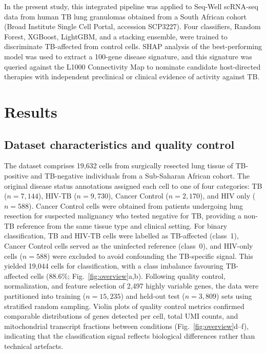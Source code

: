 \documentclass[12pt]{article}
\begin{document}
In the present study, this integrated pipeline was applied to Seq-Well scRNA-seq data from human TB lung granulomas obtained from a South African cohort (Broad Institute Single Cell Portal, accession SCP3227)\cite{scp3227}. Four classifiers, Random Forest, XGBoost, LightGBM, and a stacking ensemble\cite{wolpert1992}, were trained to discriminate TB-affected from control cells. SHAP analysis of the best-performing model was used to extract a 100-gene disease signature, and this signature was queried against the L1000 Connectivity Map to nominate candidate host-directed therapies with independent preclinical or clinical evidence of activity against TB.

\section*{Results}

\subsection*{Dataset characteristics and quality control}

The dataset comprises 19,632 cells from surgically resected lung tissue of TB-positive and TB-negative individuals from a Sub-Saharan African cohort. The original disease status annotations assigned each cell to one of four categories: TB ($n = 7{,}144$), HIV-TB ($n = 9{,}730$), Cancer Control ($n = 2{,}170$), and HIV only ($n = 588$). Cancer Control cells were obtained from patients undergoing lung resection for suspected malignancy who tested negative for TB, providing a non-TB reference from the same tissue type and clinical setting. For binary classification, TB and HIV-TB cells were labelled as TB-affected (class~1), Cancer Control cells served as the uninfected reference (class~0), and HIV-only cells ($n = 588$) were excluded to avoid confounding the TB-specific signal. This yielded 19,044 cells for classification, with a class imbalance favouring TB-affected cells (88.6\%; Fig.~\ref{fig:overview}a,b). Following quality control, normalization, and feature selection of 2,497 highly variable genes, the data were partitioned into training ($n = 15{,}235$) and held-out test ($n = 3{,}809$) sets using stratified random sampling. Violin plots of quality control metrics confirmed comparable distributions of genes detected per cell, total UMI counts, and mitochondrial transcript fractions between conditions (Fig.~\ref{fig:overview}d--f), indicating that the classification signal reflects biological differences rather than technical artefacts.
\end{document}
